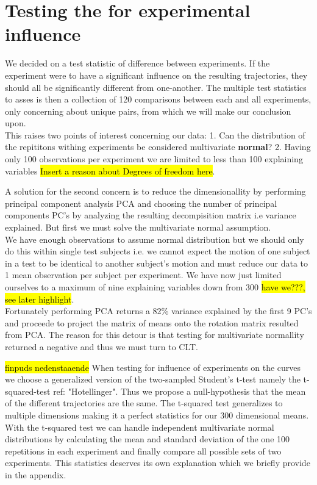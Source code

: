 \documentclass{article}
\begin{document}
\section{Testing the for experimental influence}
We decided on a test statistic of difference between experiments. If the experiment were to have a significant influence on the resulting trajectories, they should all be significantly different from one-another. The multiple test statistics to asses is then a collection of 120 comparisons between each and all experiments, only concerning about unique pairs, from which we will make our conclusion upon.\\ This raises two points of interest concerning our data:
1. Can the distribution of the repititons withing experiments be considered multivariate \textbf{normal}?
2. Having only 100 observations per experiment we are limited to less than 100 explaining variables \hl{Insert a reason about Degrees of freedom here}.

A solution for the second concern is to reduce the dimensionallity by performing principal component analysis PCA and choosing the number of principal components PC's by analyzing the resulting decompisition matrix i.e variance explained. But first we must solve the  multivariate normal assumption. \\
 We have enough observations to assume normal distribution but we should only do this within single test subjects i.e. we cannot expect the motion of one subject in a test to be identical to another subject's motion and must reduce our data to 1 mean observation per subject per experiment. We have now just limited ourselves to a maximum of nine explaining variables down from 300 \hl{have we???, see later highlight}. \\
 Fortunately performing PCA returns a 82\% variance explained by the first 9 PC's and proceede to project the matrix of means onto the rotation matrix resulted from PCA. The reason for this detour is that testing for multivariate normallity returned a negative and thus we must turn to CLT.

\hl{finpuds nedenstaaende}
When testing for influence of experiments on the curves we choose a  generalized version of the two-sampled Student's t-test namely the t-squared-test ref: "Hotellinger". Thus we propose a null-hypothesis that the mean of the different trajectories are the same. The t-squared test generalizes to multiple dimensions making it a perfect statistics for our 300 dimensional means. With the t-squared test we can handle independent multivariate normal distributions by calculating the mean and standard deviation of the one 100 repetitions in each experiment and finally compare all possible sets of two experiments. This statistics deserves its own explanation which we briefly provide in the appendix.
\end{document}
